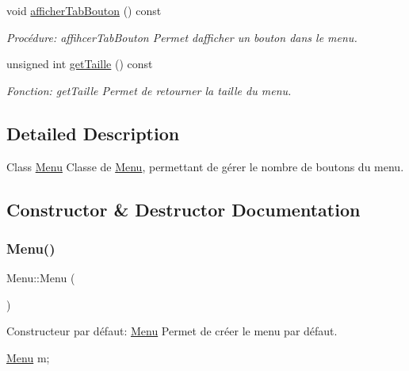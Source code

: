 \begin{DoxyCompactItemize}
void \hyperlink{classMenu_abf73624171efcb0b3605dffbf6fdd43e}{afficher\+Tab\+Bouton} () const
\begin{DoxyCompactList}\small\item\em Procédure\+: affihcer\+Tab\+Bouton Permet d\textquotesingle{}afficher\textquotesingle{} un bouton dans le menu. \end{DoxyCompactList}\item 
unsigned int \hyperlink{classMenu_a18df56bedec00d9a6a79ae1625c67329}{get\+Taille} () const
\begin{DoxyCompactList}\small\item\em Fonction\+: get\+Taille Permet de retourner la taille du menu. \end{DoxyCompactList}\end{DoxyCompactItemize}


\subsection{Detailed Description}
Class \hyperlink{classMenu}{Menu} Classe de \hyperlink{classMenu}{Menu}, permettant de gérer le nombre de boutons du menu. 

\subsection{Constructor \& Destructor Documentation}
\mbox{\label{classMenu_ad466dd83355124a6ed958430450bfe94}} 
\subsubsection{\texorpdfstring{Menu()}{Menu()}\hspace{0.1cm}{\footnotesize\ttfamily [1/3]}}
{\footnotesize\ttfamily Menu\+::\+Menu (\begin{DoxyParamCaption}{ }\end{DoxyParamCaption})}



Constructeur par défaut\+: \hyperlink{classMenu}{Menu} Permet de créer le menu par défaut. 


\begin{DoxyCode}
\hyperlink{classMenu}{Menu} m;
\end{DoxyCode}
 \mbox{\label{classMenu_a255104f828234493ca62a43d144d2573}} 
